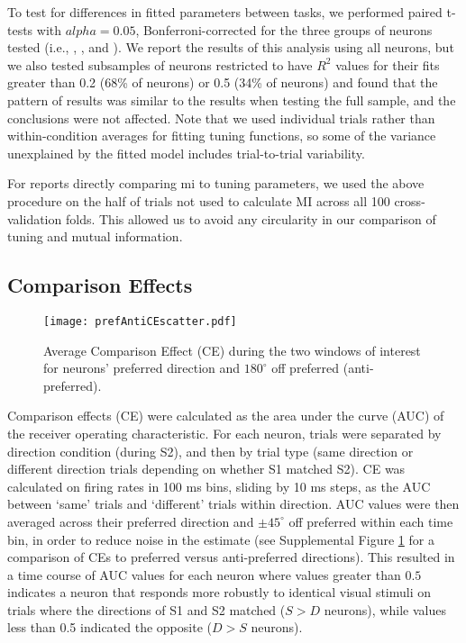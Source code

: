 To test for differences in fitted parameters between tasks, we performed paired t-tests with $alpha = 0.05$, Bonferroni-corrected for the three groups of neurons tested (i.e., \suppressed, \enhanced, and \consistent). We report the results of this analysis using all neurons, but we also tested subsamples of neurons restricted to have $R^2$ values for their fits greater than 0.2 (68\% of neurons) or 0.5 (34\% of neurons) and found that the pattern of results was similar to the results when testing the full sample, and the conclusions were not affected. Note that we used individual trials rather than within-condition averages for fitting tuning functions, so some of the variance unexplained by the fitted model includes trial-to-trial variability.\label{rev:fitVar}

For reports directly comparing \gls{mi} to tuning parameters, we used the above procedure on the half of trials not used to calculate MI across all 100 cross-validation folds. This allowed us to avoid any circularity in our comparison of tuning and mutual information. 

\subsection*{Comparison Effects}


	\begin{figure}
		\centering
		\texttt{[image: prefAntiCEscatter.pdf]}
		\caption{Average Comparison Effect (CE) during the two windows of interest for neurons' preferred direction and $180^{\circ}$ off preferred (anti-preferred).  }
		\label{fig:suppCe} %
	\end{figure}

Comparison effects (CE) were calculated as the area under the curve (AUC) of the receiver operating characteristic. For each neuron, trials were separated by direction condition (during S2), and then by trial type (same direction or different direction trials depending on whether S1 matched S2).\label{rev:ceSep} CE was calculated on firing rates in 100 ms bins, sliding by 10 ms steps, as the AUC between `same' trials and `different' trials within direction. AUC values were then averaged across their preferred direction and $\pm 45^{\circ}$ off preferred within each time bin, in order to reduce noise in the estimate (see Supplemental Figure \ref{fig:suppCe} for a comparison of CEs to preferred versus anti-preferred directions). This resulted in a time course of AUC values for each neuron where values greater than $0.5$ indicates a neuron that responds more robustly to identical visual stimuli on trials where the directions of S1 and S2 matched ($S>D$ neurons), while values less than 0.5 indicated the opposite ($D>S$ neurons). 

